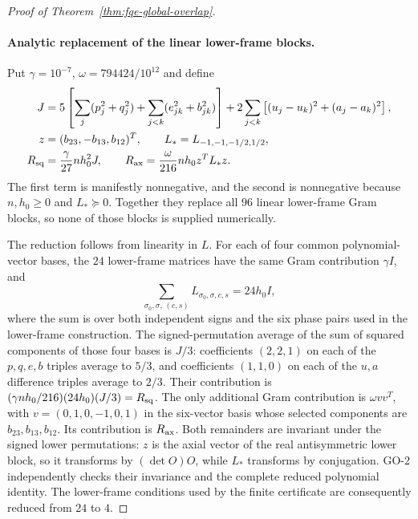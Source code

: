 \begin{proof}[Proof of Theorem~\ref{thm:fqe-global-overlap}]
\paragraph{Analytic replacement of the linear lower-frame blocks.}
Put $\gamma=10^{-7}$, $\omega=794424/10^{12}$ and define
\begin{align*}
 J={}&5\left[\sum_j(p_j^2+q_j^2)+\sum_{j<k}(e_{jk}^2+b_{jk}^2)\right]
       +2\sum_{j<k}\left[(u_j-u_k)^2+(a_j-a_k)^2\right],\\
 z={}&(b_{23},-b_{13},b_{12})^T,\qquad L_*=L_{-1,-1,-1/2,1/2},\\
 R_{\rm sq}={}&\frac{\gamma}{27}nh_0^2J,\qquad
 R_{\rm ax}=\frac{\omega}{216}nh_0z^TL_*z.
\end{align*}
The first term is manifestly nonnegative, and the second is nonnegative because $n,h_0\ge0$ and $L_*\succeq0$.
Together they replace all $96$ linear lower-frame Gram blocks, so none of those blocks is supplied numerically.

The reduction follows from linearity in $L$. For each of four common polynomial-vector bases, the $24$ lower-frame
matrices have the same Gram contribution $\gamma I$, and
\[
 \sum_{\sigma_0,\sigma,\,(c,s)}L_{\sigma_0,\sigma,c,s}=24h_0I,
\]
where the sum is over both independent signs and the six phase pairs used in the lower-frame construction.
The signed-permutation average of the sum of squared components of those four bases is $J/3$:
coefficients $(2,2,1)$ on each of the $p,q,e,b$ triples average to $5/3$, and coefficients $(1,1,0)$ on each
of the $u,a$ difference triples average to $2/3$. Their contribution is
$(\gamma nh_0/216)(24h_0)(J/3)=R_{\rm sq}$.
The only additional Gram contribution is $\omega vv^T$, with $v=(0,1,0,-1,0,1)$ in the six-vector basis
whose selected components are $b_{23},b_{13},b_{12}$. Its contribution is $R_{\rm ax}$.
Both remainders are invariant under the signed lower permutations: $z$ is the axial vector of the real
antisymmetric lower block, so it transforms by $(\det O)O$, while $L_*$ transforms by conjugation.
GO-2 independently checks their invariance and the complete reduced polynomial identity.
The lower-frame conditions used by the finite certificate are consequently reduced from $24$ to $4$.


\end{proof}
